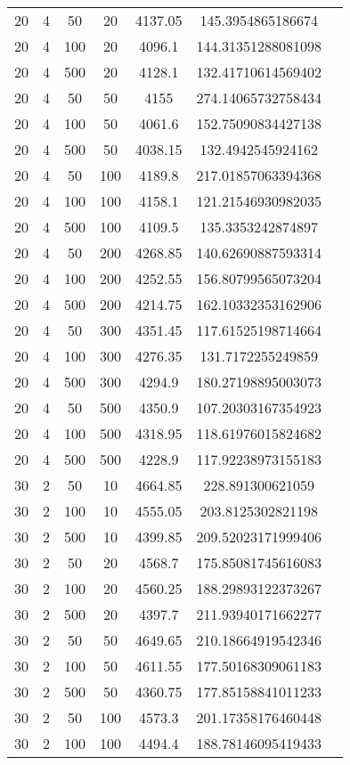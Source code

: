 {\begin{longtabu}{S
S
S
S
S
S[round-mode=places,round-precision=0]
S[round-mode=places,round-precision=0]}
20 & 4 & 50 & 20 & 4137.05 & 145.3954865186674 \\
20 & 4 & 100 & 20 & 4096.1 & 144.31351288081098 \\
20 & 4 & 500 & 20 & 4128.1 & 132.41710614569402 \\
20 & 4 & 50 & 50 & 4155 & 274.14065732758434 \\
20 & 4 & 100 & 50 & 4061.6 & 152.75090834427138 \\
20 & 4 & 500 & 50 & 4038.15 & 132.4942545924162 \\
20 & 4 & 50 & 100 & 4189.8 & 217.01857063394368 \\
20 & 4 & 100 & 100 & 4158.1 & 121.21546930982035 \\
20 & 4 & 500 & 100 & 4109.5 & 135.3353242874897 \\
20 & 4 & 50 & 200 & 4268.85 & 140.62690887593314 \\
20 & 4 & 100 & 200 & 4252.55 & 156.80799565073204 \\
20 & 4 & 500 & 200 & 4214.75 & 162.10332353162906 \\
20 & 4 & 50 & 300 & 4351.45 & 117.61525198714664 \\
20 & 4 & 100 & 300 & 4276.35 & 131.7172255249859 \\
20 & 4 & 500 & 300 & 4294.9 & 180.27198895003073 \\
20 & 4 & 50 & 500 & 4350.9 & 107.20303167354923 \\
20 & 4 & 100 & 500 & 4318.95 & 118.61976015824682 \\
20 & 4 & 500 & 500 & 4228.9 & 117.92238973155183 \\
30 & 2 & 50 & 10 & 4664.85 & 228.891300621059 \\
30 & 2 & 100 & 10 & 4555.05 & 203.8125302821198 \\
30 & 2 & 500 & 10 & 4399.85 & 209.52023171999406 \\
30 & 2 & 50 & 20 & 4568.7 & 175.85081745616083 \\
30 & 2 & 100 & 20 & 4560.25 & 188.29893122373267 \\
30 & 2 & 500 & 20 & 4397.7 & 211.93940171662277 \\
30 & 2 & 50 & 50 & 4649.65 & 210.18664919542346 \\
30 & 2 & 100 & 50 & 4611.55 & 177.50168309061183 \\
30 & 2 & 500 & 50 & 4360.75 & 177.85158841011233 \\
30 & 2 & 50 & 100 & 4573.3 & 201.17358176460448 \\
30 & 2 & 100 & 100 & 4494.4 & 188.78146095419433 \\

\end{longtabu}}
